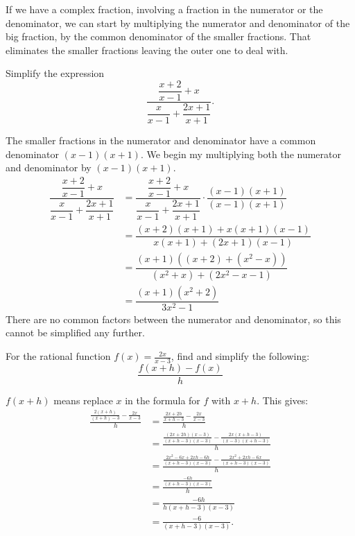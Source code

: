 \documentclass{ximera}
\begin{document}
If we have a complex fraction, involving a fraction in the numerator or the denominator, we can start by multiplying the numerator
and denominator of the big fraction, by the common denominator of the smaller fractions.  That eliminates the smaller fractions leaving
the outer one to deal with.
\begin{example}
	Simplify the expression \[ \dfrac{ \dfrac{x+2}{x-1} + x}{\dfrac{x}{x-1} + \dfrac{2x+1}{x+1}}.\]
	\begin{explanation}
		The smaller fractions in the numerator and denominator have a common denominator $(x-1)(x+1)$.  We begin my multiplying
		both the numerator and denominator by $(x-1)(x+1)$.
		\begin{align*}
			\dfrac{ \dfrac{x+2}{x-1} + x}{\dfrac{x}{x-1} + \dfrac{2x+1}{x+1}} &= \dfrac{ \dfrac{x+2}{x-1} + x}{\dfrac{x}{x-1} + \dfrac{2x+1}{x+1}} \cdot \dfrac{(x-1)(x+1)}{(x-1)(x+1)}\\
				&= \dfrac{(x+2)(x+1) + x(x+1)(x-1)}{x(x+1) + (2x+1)(x-1)}\\
				&= \dfrac{(x+1)\left( (x+2)  + (x^2-x) \right)}{(x^2+x) + (2x^2 - x - 1)}\\
				&= \dfrac{(x+1)\left( x^2 + 2 \right)}{3 x^2 - 1}
		\end{align*}
		There are no common factors between the numerator and denominator, so this cannot be simplified any further.
	\end{explanation}
\end{example}

\begin{example}
	For the rational function $\displaystyle f(x) = \frac{2x}{x-3}$, find and simplify the following:
		\[ \frac{f(x+h)-f(x)}{h} \]
	\begin{explanation}
		$\displaystyle f(x+h)$ means replace $x$ in the formula for $f$ with $x+h$.  This gives:
		\begin{align*}
			\frac{\frac{2(x+h)}{(x+h)-3} - \frac{2x}{x-3} }{h} &= \frac{ \frac{2x+2h}{x+h-3} - \frac{2x}{x-3}}{h} \\
				&= \frac{ \frac{ (2x+2h)(x-3) }{(x+h-3)(x-3)} - \frac{2x(x+h-3)}{(x-3)(x+h-3)} }{h}\\
				&= \frac{ \frac{2x^2-6x+2xh-6h}{(x+h-3)(x-3)} - \frac{2x^2+2xh-6x}{(x+h-3)(x-3)}  }{h}\\
				&= \frac{  \frac{-6h}{(x+h-3)(x-3)}     }{h} \\
				&= \frac{-6h}{h(x+h-3)(x-3)} \\
				&= \frac{-6}{(x+h-3)(x-3)}.
		\end{align*}
	\end{explanation}
\end{example}
\end{document}
